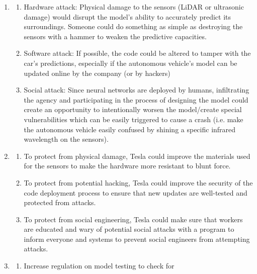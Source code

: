 \documentclass[submit]{harvardml}
\begin{document}
\newpage
\begin{sol}{}
  \begin{center}
    \begin{enumerate}
      \item 
        \begin{enumerate}
          \item Hardware attack: Physical damage to the sensors
          (LiDAR or ultrasonic damage) would disrupt the model's
          ability to accurately predict its surroundings. Someone
          could do something as simple as destroying the sensors with
          a hammer to weaken the predictive capacities.
          \item Software attack: If possible, the code could be 
          altered to tamper with the car's predictions, especially if
          the autonomous vehicle's model can be updated online by
          the company (or by hackers)
          \item Social attack: Since neural networks are deployed by
          humans, infiltrating the agency and participating in the
          process of designing the model could create an opportunity
          to intentionally worsen the model/create special vulnerabilities
          which can be easily triggered to cause a crash (i.e. make the
          autonomous vehicle easily confused by shining a specific infrared
          wavelength on the sensors).
        \end{enumerate}
      \item 
        \begin{enumerate}
          \item To protect from physical damage, Tesla could
          improve the materials used for the sensors to make
          the hardware more resistant to blunt force.
          \item To protect from potential hacking, Tesla could
          improve the security of the code deployment process
          to ensure that new updates are well-tested and protected
          from attacks.
          \item To protect from social engineering, Tesla could
          make sure that workers are educated and wary of potential
          social attacks with a program to inform everyone and systems
          to prevent social engineers from attempting attacks.
        \end{enumerate}
      \item 
        \begin{enumerate}
          \item Increase regulation on model testing to check for

\end{enumerate}
\end{enumerate}
\end{center}
\end{sol}
\end{document}
